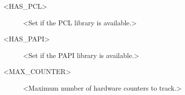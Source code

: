 %


\begin{description}

\item [<HAS\_PCL>] <Set if the PCL library is available.>
\item [<HAS\_PAPI>] <Set if the PAPI library is available.>
\item [<MAX\_COUNTER>] <Maximum number of hardware counters to track.>

\end{description}







